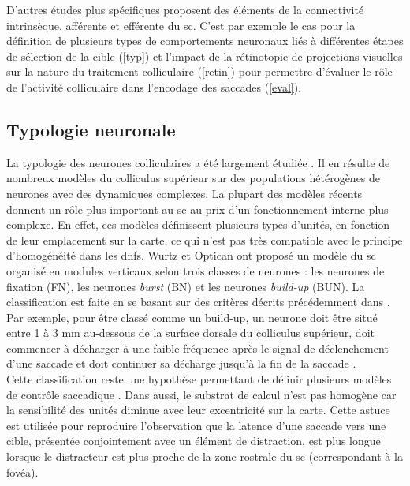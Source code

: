 D'autres études plus spécifiques proposent des éléments de la connectivité intrinsèque, afférente et efférente du \gls{sc}. C'est par exemple le cas pour la définition de plusieurs types de comportements neuronaux liés à différentes étapes de sélection de la cible \cite{Wurtz:1994} (\ref{typ}) et l'impact de la rétinotopie de projections visuelles sur la nature du traitement colliculaire \cite{Trappenberg:2001, Schneider:2002,Godijn:2002} (\ref{retin}) pour permettre d'évaluer le rôle de l'activité colliculaire dans l'encodage des saccades (\ref{eval}).




\subsection{Typologie neuronale}{\label{typ}}

La typologie des neurones colliculaires a été largement étudiée \cite {Wurtz:1994, Moschovakis:1996}. Il en résulte de nombreux modèles du colliculus supérieur sur des populations hétérogènes de neurones avec des dynamiques complexes. La plupart des modèles récents donnent un rôle plus important au \gls{sc} au prix d'un fonctionnement interne plus complexe. En effet, ces modèles définissent plusieurs types d'unités, en fonction de leur emplacement sur la carte, ce qui n'est pas très compatible avec le principe d'homogénéité dans les \glspl{dnf}. Wurtz et Optican ont proposé un modèle du \gls{sc} organisé en modules verticaux selon trois classes de neurones \cite{Wurtz:1994} : les neurones de fixation (FN), les neurones \textit{burst} (BN) et les neurones \textit{build-up} (BUN). La classification est faite en se basant sur des critères décrits précédemment dans \cite {Goldberg:1972,Munoz:1993a,Dorris:1997,Munoz:1995a}. \\



Par exemple, pour être classé comme un build-up, un neurone doit être situé entre 1 à 3 mm au-dessous de la surface dorsale du colliculus supérieur, doit commencer à décharger à une faible fréquence après le signal de déclenchement d'une saccade et doit continuer sa décharge jusqu'à la fin de la saccade \cite{Munoz:1995a,Dorris:1997}. \\



Cette classification reste une hypothèse permettant de définir plusieurs modèles de contrôle saccadique \cite{Trappenberg:2001, Schneider:2002}. Dans \cite {Godijn:2002} aussi, le substrat de calcul n'est pas homogène car la sensibilité des unités diminue avec leur excentricité sur la carte. Cette astuce est utilisée pour reproduire l'observation que la latence d'une saccade vers une cible, présentée conjointement avec un élément de distraction, est plus longue lorsque le distracteur est plus proche de la zone rostrale du \gls{sc} (correspondant à la fovéa).\\ 

